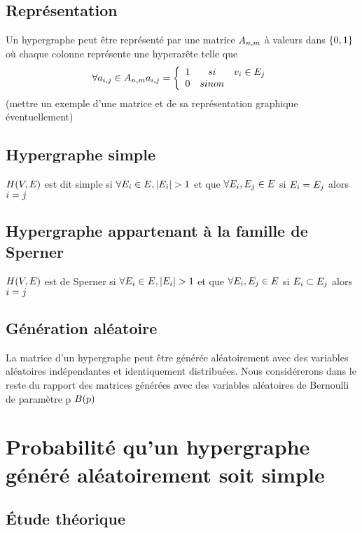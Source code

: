 \documentclass[a4paper,11pt]{article}
\begin{document}
\subsection{Représentation}
Un hypergraphe peut être représenté par une matrice $\mathlarger{A_{n,m}}$ à valeurs dans $\mathlarger{\{0,1\}}$ où chaque colonne représente une hyperarête telle que
\[\forall a_{i,j} \in A_{n,m} a_{i,j} = 
	\left \{
   \begin{array}{r c l}
      1  &si& v_{i} \in E_{j} \\
      0   &sinon \\
   \end{array}
   \right . \]
(mettre un exemple d'une matrice et de sa représentation graphique éventuellement)\\

\subsection{Hypergraphe simple}
$\mathlarger{H(V,E)}$ est dit simple si $\mathlarger{\forall E_{i} \in E, |E_{i}|>1}$ et que $\mathlarger{\forall E_{i}, E_{j} \in E}$ si $\mathlarger{E_{i} = E_{j} }$ alors $\mathlarger{i = j}$

\subsection{Hypergraphe appartenant à la famille de Sperner}
$\mathlarger{H(V,E)}$ est de Sperner si $\mathlarger{\forall E_{i} \in E, |E_{i}|>1}$ et que $\mathlarger{\forall E_{i}, E_{j} \in E}$ si $\mathlarger{E_{i} \subset E_{j} }$ alors $\mathlarger{i = j}$

\subsection{Génération aléatoire}
La matrice d'un hypergraphe peut être générée aléatoirement avec des variables aléatoires indépendantes et identiquement distribuées. Nous considérerons dans le reste du rapport des matrices générées avec des variables aléatoires de Bernoulli de paramètre p $\mathlarger{B(p)}$ 


\newpage

\section{Probabilité qu'un hypergraphe généré aléatoirement soit simple}
\subsection{Étude théorique}
\end{document}
